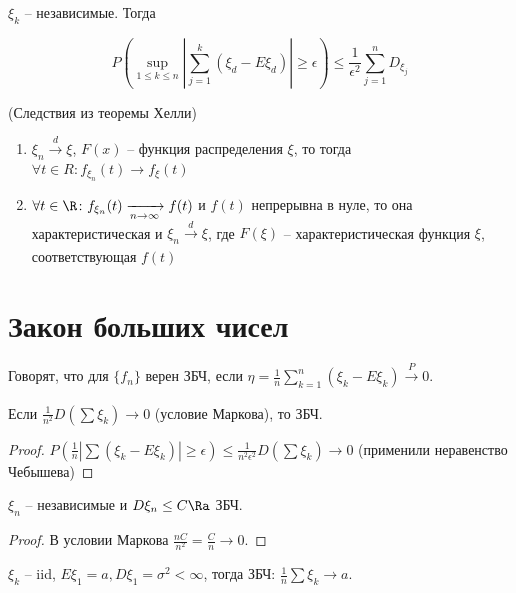 \begin{theorem}
$\xi_k$ -- независимые. Тогда

$$P(\sup\limits_{1\leq k \leq n} |\sum\limits_{j = 1}^k(\xi_d - E\xi_d)| \geq \epsilon) \leq \frac{1}{\epsilon^2}\sum\limits_{j=1}^n D_{\xi_j}$$
\end{theorem}

\begin{theorem} (Следствия из теоремы Хелли)

\begin{enumerate}

\item $\xi_n \xrightarrow[]{d} \xi$, $F(x)$ -- функция распределения $\xi$, то тогда $\forall t \in R \colon f_{\xi_n}(t) \to f_\xi(t)$
\item $\forall t \in \R \colon f_{\xi_n}(t) \xrightarrow[n \to \infty]{} f(t)$  и $f(t)$ непрерывна в нуле, 
то она характеристическая и $\xi_n \xrightarrow[]{d} \xi$, где $F(\xi)$ -- характеристическая функция $\xi$, соответствующая $f(t)$

\end{enumerate}


\end{theorem}
\section{Закон больших чисел}
\begin{Def}
Говорят, что для $\{f_n\}$ верен ЗБЧ, если $\eta = \frac1n \sum\limits_{k=1}^n (\xi_k - E\xi_k) \xrightarrow[]{P} 0$.
\end{Def}

\begin{theorem}[Марков]
Если $\frac{1}{n^2} D (\sum \xi_k) \to 0$ (условие Маркова), то ЗБЧ.
\end{theorem}
\begin{proof}
$P(\frac1n | \sum (\xi_k - E\xi_k) | \geq \epsilon) \leq \frac{1}{n^2 \epsilon^2} D(\sum \xi_k) \to 0$ (применили неравенство Чебышева)
\end{proof}

\begin{theorem}[Чебышев]
$\xi_n$ -- независимые и $D\xi_n \leq C \Ra$ ЗБЧ.
\end{theorem}
\begin{proof}
В условии Маркова $\frac{nC}{n^2} = \frac{C}{n} \to 0$.
\end{proof}

\begin{theorem}[Хинчин]
$\xi_k$ -- iid, $E\xi_1 = a, D\xi_1 = \sigma^2 < \infty$, тогда ЗБЧ: $\frac1n \sum \xi_k \to a$.
\end{theorem}

